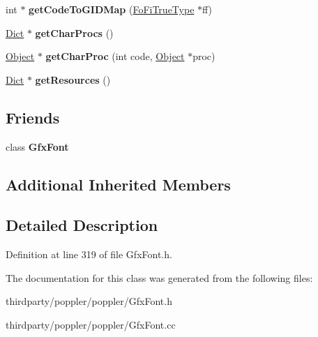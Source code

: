 \begin{DoxyCompactItemize}
\mbox{\label{class_gfx8_bit_font_a93fb1da12725bf649d896918e420cb58}} 
int $\ast$ {\bfseries get\+Code\+To\+G\+I\+D\+Map} (\hyperlink{class_fo_fi_true_type}{Fo\+Fi\+True\+Type} $\ast$ff)
\item 
\mbox{\label{class_gfx8_bit_font_a71e34f324623a49251ee51aed96e2acb}} 
\hyperlink{class_dict}{Dict} $\ast$ {\bfseries get\+Char\+Procs} ()
\item 
\mbox{\label{class_gfx8_bit_font_a595bf8ff1c530b1da2a8e426b5dddd18}} 
\hyperlink{class_object}{Object} $\ast$ {\bfseries get\+Char\+Proc} (int code, \hyperlink{class_object}{Object} $\ast$proc)
\item 
\mbox{\label{class_gfx8_bit_font_a0690ceb7dba6e939629df95917e8bdba}} 
\hyperlink{class_dict}{Dict} $\ast$ {\bfseries get\+Resources} ()
\end{DoxyCompactItemize}
\subsection*{Friends}
\begin{DoxyCompactItemize}
\item 
\mbox{\label{class_gfx8_bit_font_a4c32dce925a5744df5bee0e49e6293fd}} 
class {\bfseries Gfx\+Font}
\end{DoxyCompactItemize}
\subsection*{Additional Inherited Members}


\subsection{Detailed Description}


Definition at line 319 of file Gfx\+Font.\+h.



The documentation for this class was generated from the following files\+:\begin{DoxyCompactItemize}
\item 
thirdparty/poppler/poppler/Gfx\+Font.\+h\item 
thirdparty/poppler/poppler/Gfx\+Font.\+cc\end{DoxyCompactItemize}
